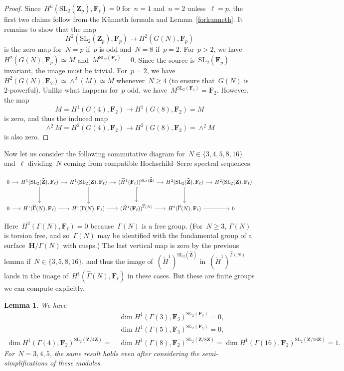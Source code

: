 \documentclass[10pt]{amsart}
\def\Gammah{\widehat{\Gamma}}
\def\Zhat{\widehat{\Z}}
\def\Htw{\widetilde{H}}
\def\F{\mathbf{F}}
\def\Z{\mathbf{Z}}
\newtheorem{lemma}[subsubsection]{Lemma}
\theoremstyle{remark}
\numberwithin{equation}{subsection}
\def\numequation{\addtocounter{subsubsection}{1}\begin{equation}}
\def\SL{\mathrm{SL}}
\def\H{\mathbf{H}}
\begin{document}
\begin{proof} Since~$H^n(\SL_2(\Z_p),\F_{\ell}) = 0$ for~$n=1$ and~$n=2$
unless~$\ell = p$, the first two claims follow from the K\"{u}nneth formula
and Lemma~\ref{forkunneth}.
It remains to show that the map
$$H^2(\SL_2(\Z_p),\F_p) \rightarrow H^2(G(N),\F_p)$$
is the zero map for~$N = p$ if~$p$ is odd and~$N = 8$ if~$p = 2$.
For~$p > 2$,
 we have~$H^2(G(N),\F_p) \simeq M$  and~$M^{\SL_2(\F_p)} = 0$.
 Since  the source is~$\SL_2(\F_p)$-invariant, the image must be trivial. For~$p = 2$, we have~$H^2(G(N),\F_2) \simeq \wedge^2(M) \simeq M$
whenever~$N \ge 4$ (to ensure that~$G(N)$ is~$2$-powerful). 
Unlike what happens for~$p$ odd, we have~$M^{\SL_2(\F_2)} = \F_2$.
However, the map
$$M = H^1(G(4),\F_2) \rightarrow H^1(G(8),\F_2) = M$$ 
is zero, and thus the induced map
$$\wedge^2 M =  H^2(G(4),\F_2) \rightarrow H^2(G(8),\F_2) = \wedge^2 M$$ 
is also zero.
\end{proof}

Now let us consider the following commutative diagram for~$N \in \{3,4,5,8,16\}$
and~$\ell$ dividing~$N$ coming from compatible
Hochschild--Serre spectral sequences:

{\small
\numequation \label{HScommutative}
\begin{tikzcd}[column sep=small, row sep=large]
0 \arrow[r] & H^1(\SL_2(\Zhat),\F_{\ell}) \arrow[r] \arrow[d] & H^1(\SL_2(\Z),\F_{\ell}) \arrow[r] \arrow[d] & (\Htw^1(\F_{\ell}))^{\SL_2(\Zhat)} \arrow[r] \arrow[d, hook] & H^2(\SL_2(\Zhat),\F_{\ell}) \arrow[r] \arrow[d] & H^2(\SL_2(\Z),\F_{\ell})  \\
0 \arrow[r] & H^1(\Gammah(N),\F_{\ell}) \arrow[r] & H^1(\Gamma(N),\F_{\ell}) \arrow[r] & (\Htw^1(\F_{\ell}))^{\Gammah(N)} \arrow[r] & H^2(\Gammah(N),\F_{\ell}) \arrow[r] & 0
\end{tikzcd}
\end{equation}
}
Here~$H^2(\Gamma(N),\F_{\ell}) = 0$ because~$\Gamma(N)$ is a free group.
(For~$N \ge 3$, $\Gamma(N)$ is torsion free, and so~$\Gamma(N)$ may
be identified with the fundamental group of a surface~$\H/\Gamma(N)$ with cusps.) 
The last vertical map is zero by the previous lemma if~$N \in \{3,5,8,16\}$, and thus the image
of~$(\Htw^1)^{\SL_2(\Zhat)}$ in~$(\Htw^1)^{\Gammah(N)}$ lands in the image
of~$H^1(\Gammah(N),\F_{\ell})$ in these cases. But these are finite groups we can compute explicitly.



\begin{lemma} \label{computeinvariants}
We have
$$
\begin{aligned}
 & \dim H^1(\Gamma(3),\F_3)^{\SL_2(\F_3)} =  0, \\
&  \dim H^1(\Gamma(5),\F_3)^{\SL_2(\F_5)} =  0, \\
\dim H^1(\Gamma(4),\F_2)^{\SL_2(\Z/4\Z)} = \
&  \dim H^1(\Gamma(8),\F_2)^{\SL_2(\Z/8\Z)}  = 
\dim H^1(\Gamma(16),\F_2)^{\SL_2(\Z/16\Z)}  = 1.
\end{aligned}
$$
For~$N = 3,4,5$, the same result holds even after considering
the semi-simplifications 
of these modules.
\end{lemma}
\end{document}
